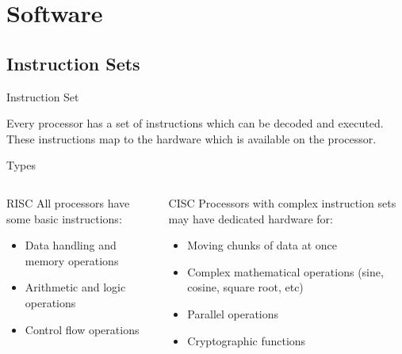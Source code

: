 \documentclass[serif,mathserif,compress]{beamer}
\begin{document}
\section{Software}

\subsection{Instruction Sets}

\begin{frame}{Instruction Set}
  \begin{block}{}
    Every processor has a set of instructions which can be decoded and executed. These instructions map to the hardware which is available on the processor.
  \end{block}
\end{frame}

\begin{frame}{Types}
  \begin{columns}[T]
  \begin{column}[T]{.45\textwidth}
    \begin{block}{RISC}
      All processors have some basic instructions:
      \begin{itemize}
        \item Data handling and memory operations
        \item Arithmetic and logic operations
        \item Control flow operations
      \end{itemize}
    \end{block}
  \end{column}
  \pause
  \begin{column}[T]{.45\textwidth}
    \begin{block}{CISC}
      Processors with complex instruction sets may have dedicated hardware for:
      \begin{itemize}
        \item Moving chunks of data at once
        \item Complex mathematical operations (sine, cosine, square root, etc)
        \item Parallel operations
        \item Cryptographic functions
      \end{itemize}
    \end{block}
  \end{column}
  \end{columns}
\end{frame}
\end{document}
